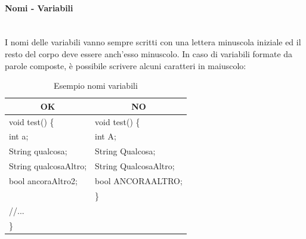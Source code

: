 \paragraph{Nomi - Variabili}\mbox{}\\[0.4cm]
I nomi delle variabili vanno sempre scritti con una lettera minuscola iniziale ed il resto del corpo deve essere anch’esso minuscolo. In caso di variabili formate da parole composte, è possibile scrivere alcuni caratteri in maiuscolo:
\begin{table} [H]
		\begin{center}
			\begin{tabular}{ | l | l |}
				\multicolumn{1}{c}{\textbf{OK}}&\multicolumn{1}{c}{\textbf{NO}}\\ 
				\hline
				void test() \{
				&void test() \{\\
				\hspace{0.5cm}int a;
				&\hspace{0.5cm}int A;\\
				\hspace{0.5cm}String qualcosa;
				&\hspace{0.5cm}String Qualcosa;\\
				\hspace{0.5cm}String qualcosaAltro;
				&\hspace{0.5cm}String QualcosaAltro;\\
				\hspace{0.5cm}bool ancoraAltro2;
				&\hspace{0.5cm}bool ANCORAALTRO;\\
				&\}\\
				\hspace{0.5cm}//...									&
				\\
				\}&\\
				\hline
			\end{tabular}
		\end{center}
		\caption{Esempio nomi variabili}
\end{table}
	
